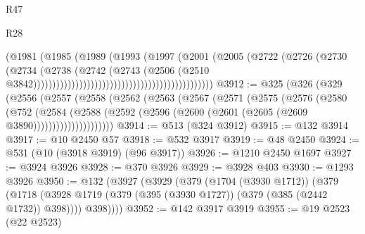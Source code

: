 \begin{lexlean}{R47}
\begin{lexlean}{R28}
\begin{coremodule}
{{{{{{{{{{{{{{{{{{{{{{{{{{{{{{{{{{{{{{{{{{{{{{{{{{{{{{{{{{{{{{{{{{{{{{{{{{{{{{{{{{{{{{{{{{{{{{{{{{{{{{{{{{{{{{{{{{{{{{{{{{{{{{{{{{{{{                                                                  (@1981
                                                                    (@1985
                                                                      (@1989
                                                                        (@1993
                                                                          (@1997
                                                                            (@2001
                                                                              (@2005
                                                                                (@2722
                                                                                  (@2726
                                                                                    (@2730
                                                                                      (@2734
                                                                                        (@2738
                                                                                          (@2742
                                                                                            (@2743
                                                                                              (@2506
                                                                                                (@2510
                                                                                                  @3842)))))))))))))))))))))))))))))))))))))))))))))))
@3912 := @325
    (@326
      (@329
        (@2556
          (@2557
            (@2558
              (@2562
                (@2563
                  (@2567
                    (@2571
                      (@2575
                        (@2576
                          (@2580
                            (@752
                              (@2584
                                (@2588
                                  (@2592
                                    (@2596 (@2600 (@2601 (@2605 (@2609 @3890)))))))))))))))))))))
@3914 := @513 (@324 @3912)
@3915 := @132 @3914
@3917 := @10 @2450 @57
@3918 := @532 @3917
@3919 := @48 @2450
@3924 := @531 (@10 (@3918 @3919) (@96 @3917))
@3926 := @1210 @2450 @1697
@3927 := @3924 @3926
@3928 := @370 @3926
@3929 := @3928 @403
@3930 := @1293 @3926
@3950 := @132
    (@3927
      (@3929
        (@379
          (@1704 (@3930 @1712))
          (@379
            (@1718 (@3928 @1719 (@379 (@395 (@3930 @1727)) (@379 (@385 (@2442 @1732)) @398))))
            @398))))
@3952 := @142 @3917 @3919
@3955 := @19 @2523 (@22 @2523)
}}}}}}}}}}}}}}}}}}}}}}}}}}}}}}}}}}}}}}}}}}}}}}}}}}}}}}}}}}}}}}}}}}}}}}}}}}}}}}}}}}}}}}}}}}}}}}}}}}}}}}}}}}}}}}}}}}}}}}}}}}}}}}}}}}}}}
\end{coremodule}
\end{lexlean}
\end{lexlean}
